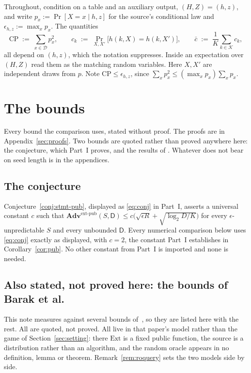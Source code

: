 \documentclass{aicr-solution}
\newcommand{\Adv}{\mathbf{Adv}}
\newcommand{\extp}{\mathrm{ext}\text{-}\mathrm{pub}}
\newcommand{\calK}{\mathcal{K}}
\newcommand{\calD}{\mathcal{D}}
\newcommand{\CP}{\mathrm{CP}}
\begin{document}
\medskip
Throughout, condition on a table and an auxiliary output, $(H,Z) = (h,z)$, and write
$p_x := \Pr[X = x \mid h, z]$ for the source's conditional law and $\epsilon_{h,z} := \max_x p_x$.
The quantities
\[
  \CP \;:=\; \sum_{x \in \calD} p_x^2 ,
  \qquad
  c_k \;:=\; \Pr_{X,X'}\bigl[h(k,X) = h(k,X')\bigr] ,
  \qquad
  \bar c \;:=\; \frac1K \sum_{k \in \calK} c_k ,
\]
all depend on $(h,z)$, which the notation suppresses. Inside an expectation over $(H,Z)$ read them
as the matching random variables. Here $X, X'$ are independent draws from $p$. Note
$\CP \le \epsilon_{h,z}$, since $\sum_x p_x^2 \le (\max_x p_x)\sum_x p_x$.

\section{The bounds}\label{sec:bounds}

Every bound the comparison uses, stated without proof. The proofs are in
Appendix~\ref{sec:proofs}. Two bounds are quoted rather than proved anywhere here: the conjecture,
which Part~I proves, and the results of \cite{BDKPPSY11}. Whatever does not bear on
seed length is in the appendices.

\subsection*{The conjecture}

Conjecture~\ref{conj:stmt-pub}, displayed as \eqref{eq:conj} in Part~I, asserts a universal
constant $c$ such that
$\Adv^{\extp}(S,\mathsf{D}) \le c\bigl(\sqrt{\epsilon R} + \sqrt{\log_2 D/K}\bigr)$
for every $\epsilon$-unpredictable $S$ and every unbounded $\mathsf{D}$. Every numerical
comparison below uses \eqref{eq:conj} exactly as displayed, with $c = 2$, the constant Part~I
establishes in Corollary~\ref{cor:pub}. No other constant from Part~I is imported and none is
needed.

\subsection*{Also stated, not proved here: the bounds of Barak et al.}

This note measures against several bounds of~\cite{BDKPPSY11}, so they are listed here with the
rest. All are quoted, not proved. All live in that paper's model rather than the game of
Section~\ref{sec:setting}: there $\mathrm{Ext}$ is a fixed public function, the source is a
distribution rather than an algorithm, and the random oracle appears in no definition, lemma or
theorem. Remark~\ref{rem:roquery} sets the two models side by side.
\end{document}
